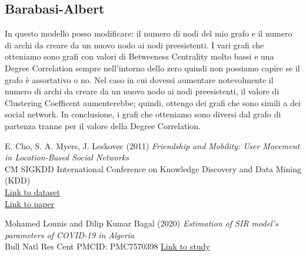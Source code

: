 \documentclass[a4paper]{article}
\begin{document}
\subsection{Barabasi-Albert}
In questo modello posso modificare: il numero di nodi del mio grafo e il numero di archi da creare da un nuovo nodo ai nodi preesistenti.
I vari grafi che otteniamo sono grafi con valori di Betweeness Centrality molto bassi e una Degree Correlation sempre nell’intorno dello zero quindi non possiamo capire se il grafo è assortativo o no. Nel caso in cui dovessi aumentare notevolmente il numero di archi da creare da un nuovo nodo ai nodi preesistenti, il valore di Clustering Coefficent aumenterebbe; quindi, ottengo dei grafi che sono simili a dei social network. In conclusione, i grafi che otteniamo sono diversi dal grafo di partenza tranne per il valore della Degree Correlation.
\begin{thebibliography}{9}

E. Cho, S. A. Myers, J. Leskovec (2011) \emph{Friendship and Mobility: User Movement in Location-Based Social Networks}\\
CM SIGKDD International Conference on Knowledge Discovery and Data Mining (KDD)\\
\href{http://snap.stanford.edu/data/loc-brightkite.html}{Link to dataset}\\
\href{https://cs.stanford.edu/people/jure/pubs/mobile-kdd11.pdf}{Link to paper}

Mohamed Lounis and Dilip Kumar Bagal (2020) \emph{Estimation of SIR model’s parameters of COVID-19 in Algeria}\\
Bull Natl Res Cent PMCID: PMC7570398
\href{https://www.ncbi.nlm.nih.gov/pmc/articles/PMC7570398/}{Link to study}
\end{thebibliography}
\end{document}
